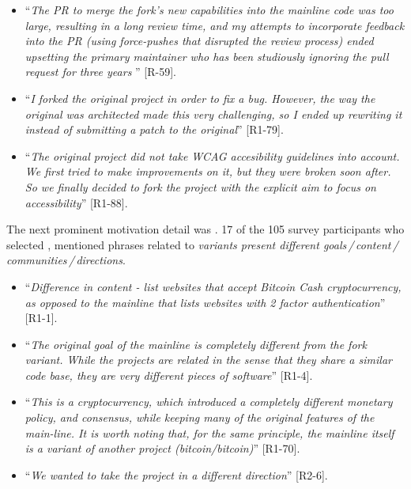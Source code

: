 \begin{itemize}[leftmargin=*]


\item ``\emph{The PR to merge the fork's new capabilities into the mainline code was too large, resulting in a long review time, and my attempts to incorporate feedback into the PR (using force-pushes that disrupted the review process) ended upsetting the primary maintainer who has been studiously ignoring the pull request for three years \frownie{}}'' [R-59].

\item ``\emph{I forked the original project in order to fix a bug. However, the way the original was architected made this very challenging, so I ended up rewriting it instead of submitting a patch to the original}'' [R1-79].

\item ``\emph{The original project did not take WCAG accesibility guidelines into account. We first tried to make improvements on it, but they were broken soon after. So we finally decided to fork the project with the explicit aim to focus on accessibility}'' [R1-88].

\end{itemize}

\nd The next prominent  motivation detail was . 17 of the 105 survey participants who selected ,  mentioned phrases related to \emph{variants present different goals\,/\,content\,/\,communities\,/\,directions}.

\begin{itemize}[leftmargin=*]
\item ``\emph{Difference in content - list websites that accept Bitcoin Cash cryptocurrency, as opposed to the mainline that lists websites with 2 factor authentication}'' [R1-1].
\item ``\emph{The original goal of the mainline is completely different from the fork variant. While the projects are related in the sense that they share a similar code base, they are very different pieces of software}'' [R1-4].
\item ``\emph{This is a cryptocurrency, which introduced a completely different monetary policy, and consensus, while keeping many of the original features of the main-line. It is worth noting that, for the same principle, the mainline itself is a variant of another project (bitcoin/bitcoin)}'' [R1-70].
\item  ``\emph{We wanted to take the project in a different direction}'' [R2-6].
\end{itemize}

